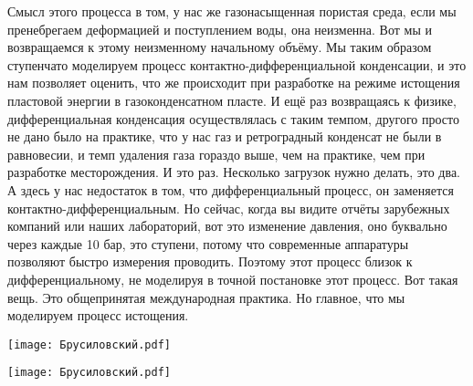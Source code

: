 \documentclass[main.tex]{subfiles}
\begin{document}
Смысл этого процесса в том, у нас же газонасыщенная пористая среда, если мы пренебрегаем деформацией и поступлением воды, она неизменна.
Вот мы и возвращаемся к этому неизменному начальному объёму.
Мы таким образом ступенчато моделируем процесс контактно-дифференциальной конденсации, и это нам позволяет оценить, что же происходит при разработке на режиме истощения пластовой энергии в газоконденсатном пласте.
И ещё раз возвращаясь к физике, дифференциальная конденсация осуществлялась с таким темпом, другого просто не дано было на практике, что у нас газ и ретроградный конденсат не были в равновесии, и темп удаления газа гораздо выше, чем на практике, чем при разработке месторождения.
И это раз.
Несколько загрузок нужно делать, это два.
А здесь у нас недостаток в том, что дифференциальный процесс, он заменяется контактно-дифференциальным.
Но сейчас, когда вы видите отчёты зарубежных компаний или наших лабораторий, вот это изменение давления, оно буквально через каждые 10 бар, это ступени, потому что современные аппаратуры позволяют быстро измерения проводить.
Поэтому этот процесс близок к дифференциальному, не моделируя в точной постановке этот процесс.
Вот такая вещь.
Это общепринятая международная практика.
Но главное, что мы моделируем процесс истощения.

\begin{center}
\texttt{[image: Брусиловский.pdf]}
\end{center}

\begin{center}
\texttt{[image: Брусиловский.pdf]}
\end{center}
\end{document}
